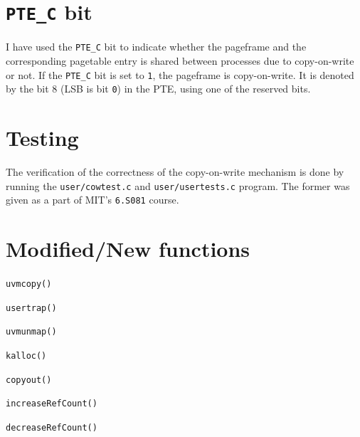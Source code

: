 \documentclass[12pt,a4paper,english]{paper}
\begin{document}
\section{\texttt{PTE\_C} bit}
I have used the \texttt{PTE\_C} bit to indicate whether the pageframe and the corresponding pagetable entry is shared between processes due to copy-on-write or not. If the \texttt{PTE\_C} bit is set to {\tt 1}, the pageframe is copy-on-write. It is denoted by the bit 8 (LSB is bit {\tt 0}) in the PTE, using one of the reserved bits.

\section{Testing}
The verification of the correctness of the copy-on-write mechanism is done by running the \texttt{user/cowtest.c} and \texttt{user/usertests.c} program. The former was given as a part of MIT's \texttt{6.S081} course.

\section{Modified/New functions}
\begin{compactitem}
    \item{\texttt{uvmcopy()}}
    \item{\texttt{usertrap()}}
    \item{\texttt{uvmunmap()}}
    \item{\texttt{kalloc()}}
    \item{\texttt{copyout()}}
    \item{\texttt{increaseRefCount()}}
    \item{\texttt{decreaseRefCount()}}
\end{compactitem}




%
%
\end{document}
